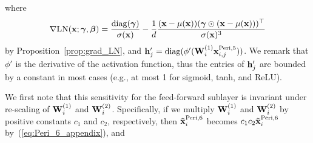 \documentclass[journal]{IEEEtran}
\newcommand{\bfW}{{\bf W}}
\newcommand{\bfh}{{\bf h}}
\newcommand{\bfx}{{\bf x}}
\newcommand{\bfgamma}{{\boldsymbol \gamma}}
\newcommand{\bfbeta}{{\boldsymbol \beta}}
\theoremstyle{plain}
\theoremstyle{definition}
\theoremstyle{remark}
\begin{document}
where
\begin{equation}
\nabla {\rm LN}(\bfx; \bfgamma, \bfbeta) = \frac{{\rm diag}(\bfgamma)}{\sigma(\bfx)} - \frac{1}{d} \frac{(\bfx-\mu(\bfx))(\bfgamma \odot (\bfx-\mu(\bfx)))^\top}{\sigma(\bfx)^3}
\end{equation}
by Proposition~\ref{prop:grad_LN}, and $\bfh'_j = {\rm diag} (\phi' ( \bfW_{i}^{(1)}\bfx^{{\rm Peri}, 5}_{i,j} ))
$. We remark that $\phi'$ is the derivative of the activation function, thus the entries of $\bfh'_j$ are bounded by a constant in most cases (e.g., at most 1 for sigmoid, tanh, and ReLU).

We first note that this sensitivity for the feed-forward sublayer is invariant under re-scaling of $\bfW_{i}^{(1)}$ and $\bfW_{i}^{(2)}$. Specifically, if we multiply $\bfW_{i}^{(1)}$ and $\bfW_{i}^{(2)}$ by positive constants $c_1$ and $c_2$, respectively, then $\tilde{\bfx}^{{\rm Peri}, 6}_i$ becomes $c_1 c_2 \tilde{\bfx}^{{\rm Peri}, 6}_i$ by~(\ref{eq:Peri_6_appendix}), and
\end{document}
